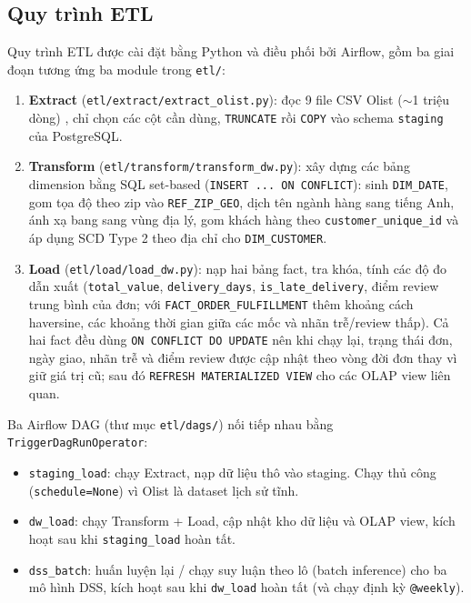 \subsection{Quy trình ETL}
\hspace{1cm}
Quy trình ETL được cài đặt bằng Python và điều phối bởi Airflow, gồm ba giai đoạn tương ứng
ba module trong \texttt{etl/}:

\begin{enumerate}
    \item \textbf{Extract} (\texttt{etl/extract/extract\_olist.py}): đọc 9 file CSV Olist ($\sim$1 triệu dòng)
          , chỉ chọn các cột cần dùng, \texttt{TRUNCATE} rồi
          \texttt{COPY} vào schema \texttt{staging} của PostgreSQL.
    \item \textbf{Transform} (\texttt{etl/transform/transform\_dw.py}): xây dựng các bảng
          dimension bằng SQL set-based (\texttt{INSERT ... ON CONFLICT}): sinh
          \texttt{DIM\_DATE}, gom tọa độ theo zip vào \texttt{REF\_ZIP\_GEO}, dịch tên ngành hàng
          sang tiếng Anh, ánh xạ bang sang vùng địa lý, gom khách hàng theo
          \texttt{customer\_unique\_id} và áp dụng SCD Type 2 theo địa chỉ cho
          \texttt{DIM\_CUSTOMER}.
    \item \textbf{Load} (\texttt{etl/load/load\_dw.py}): nạp hai bảng fact, tra khóa,
          tính các độ đo dẫn xuất (\texttt{total\_value}, \texttt{delivery\_days}, \texttt{is\_late\_delivery},
          điểm review trung bình của đơn; với \texttt{FACT\_ORDER\_FULFILLMENT} thêm khoảng cách
          haversine, các khoảng thời gian giữa các mốc và nhãn trễ/review thấp). Cả hai fact đều
          dùng \texttt{ON CONFLICT DO UPDATE} nên khi chạy lại, trạng thái đơn, ngày giao, nhãn
          trễ và điểm review được cập nhật theo vòng đời đơn thay vì giữ giá trị cũ; sau đó \texttt{REFRESH MATERIALIZED VIEW} cho các
          OLAP view liên quan.
\end{enumerate}

Ba Airflow DAG (thư mục \texttt{etl/dags/}) nối tiếp nhau bằng
\texttt{TriggerDagRunOperator}:
\begin{itemize}
    \item \texttt{staging\_load}: chạy Extract, nạp dữ liệu thô vào staging. Chạy thủ công
          (\texttt{schedule=None}) vì Olist là dataset lịch sử tĩnh.
    \item \texttt{dw\_load}: chạy Transform + Load, cập nhật kho dữ liệu và OLAP view,
          kích hoạt sau khi \texttt{staging\_load} hoàn tất.
    \item \texttt{dss\_batch}: huấn luyện lại / chạy suy luận theo lô (batch inference)
          cho ba mô hình DSS, kích hoạt sau khi \texttt{dw\_load} hoàn tất (và chạy định kỳ
          \texttt{@weekly}).
\end{itemize}

